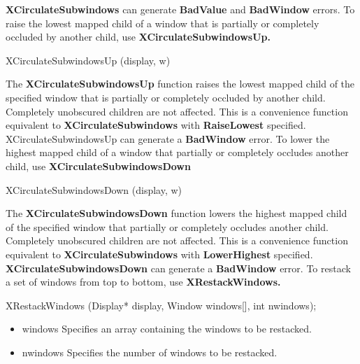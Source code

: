 \documentclass{report}
\begin{document}
\begin{itemize}
            \bigbreak \noindent 
            \textbf{XCirculateSubwindows} can generate \textbf{BadValue} and \textbf{BadWindow} errors.
            \bigbreak \noindent 
            To raise the lowest mapped child of a window that is partially or completely occluded by another child, use \textbf{XCirculateSubwindowsUp.}
            \bigbreak \noindent 
            \begin{cppcode}
                XCirculateSubwindowsUp (display, w)
            \end{cppcode}
            The \textbf{XCirculateSubwindowsUp} function raises the lowest mapped child of the specified window that is partially or completely occluded by another child. Completely unobscured children are not affected. This is a convenience function equivalent to \textbf{XCirculateSubwindows} with \textbf{RaiseLowest} specified.
            \bigbreak \noindent 
            XCirculateSubwindowsUp can generate a \textbf{BadWindow} error.
            \bigbreak \noindent 
            To lower the highest mapped child of a window that partially or completely occludes another child, use \textbf{XCirculateSubwindowsDown}
            \bigbreak \noindent 
            \begin{cppcode}
                XCirculateSubwindowsDown (display, w)
            \end{cppcode}
            The \textbf{XCirculateSubwindowsDown} function lowers the highest mapped child of the specified window that partially or completely occludes another child. Completely unobscured children are not affected. This is a convenience function equivalent to \textbf{XCirculateSubwindows} with \textbf{LowerHighest} specified.
            \bigbreak \noindent 
            \textbf{XCirculateSubwindowsDown} can generate a \textbf{BadWindow} error.
            \bigbreak \noindent 
            To restack a set of windows from top to bottom, use \textbf{XRestackWindows.}
            \bigbreak \noindent 
            \begin{cppcode}
                XRestackWindows (Display* display, Window windows[], int nwindows);
            \end{cppcode}
            \bigbreak \noindent
            \begin{itemize}
                \item windows Specifies an array containing the windows to be restacked.
                \item nwindows Specifies the number of windows to be restacked.
            \end{itemize}

\end{itemize}
\end{document}
